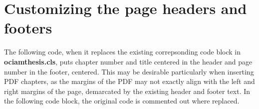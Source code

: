 \documentclass[a4paper, twoside]{templates/ociamthesis}
\begin{document}
\hypertarget{customizing-the-page-headers-and-footers}{%
\section{Customizing the page headers and footers}\label{customizing-the-page-headers-and-footers}}

The following code, when it replaces the existing correpsonding code block in \textbf{ociamthesis.cls}, puts chapter number and title centered in the header and page number in the footer, centered.
This may be desirable particularly when inserting PDF chapters, as the margins of the PDF may not exactly align with the left and right margins of the page, demarcated by the existing header and footer text.
In the following code block, the original code is commented out where replaced.
\end{document}
